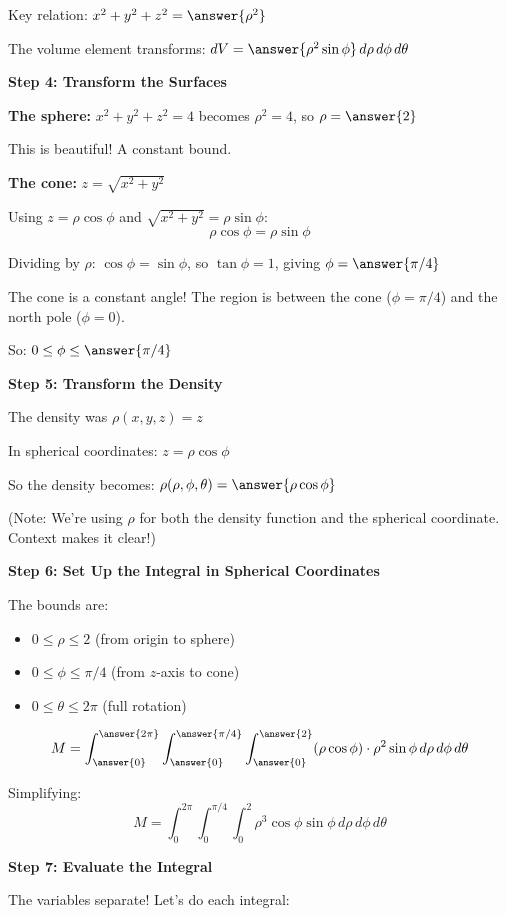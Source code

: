 \documentclass{ximera}
\begin{document}
\begin{problem}
Key relation: $x^2 + y^2 + z^2 = \answer{\rho^2}$

The volume element transforms: $dV = \answer{\rho^2 \sin\phi}\,d\rho\,d\phi\,d\theta$

\textbf{Step 4: Transform the Surfaces}

\textbf{The sphere:} $x^2 + y^2 + z^2 = 4$ becomes $\rho^2 = 4$, so $\rho = \answer{2}$

This is beautiful! A constant bound.

\textbf{The cone:} $z = \sqrt{x^2 + y^2}$

Using $z = \rho\cos\phi$ and $\sqrt{x^2+y^2} = \rho\sin\phi$:
$$\rho\cos\phi = \rho\sin\phi$$

Dividing by $\rho$: $\cos\phi = \sin\phi$, so $\tan\phi = 1$, giving $\phi = \answer{\pi/4}$

The cone is a constant angle! The region is between the cone ($\phi = \pi/4$) and the north pole ($\phi = 0$).

So: $0 \leq \phi \leq \answer{\pi/4}$

\textbf{Step 5: Transform the Density}

The density was $\rho(x,y,z) = z$

In spherical coordinates: $z = \rho\cos\phi$

So the density becomes: $\rho(\rho,\phi,\theta) = \answer{\rho\cos\phi}$

(Note: We're using $\rho$ for both the density function and the spherical coordinate. Context makes it clear!)

\textbf{Step 6: Set Up the Integral in Spherical Coordinates}

The bounds are:
\begin{itemize}
    \item $0 \leq \rho \leq 2$ (from origin to sphere)
    \item $0 \leq \phi \leq \pi/4$ (from $z$-axis to cone)
    \item $0 \leq \theta \leq 2\pi$ (full rotation)
\end{itemize}

$$M = \int_{\answer{0}}^{\answer{2\pi}} \int_{\answer{0}}^{\answer{\pi/4}} \int_{\answer{0}}^{\answer{2}} (\rho\cos\phi) \cdot \rho^2\sin\phi\,d\rho\,d\phi\,d\theta$$

Simplifying: 
$$M = \int_0^{2\pi} \int_0^{\pi/4} \int_0^2 \rho^3\cos\phi\sin\phi\,d\rho\,d\phi\,d\theta$$

\textbf{Step 7: Evaluate the Integral}

The variables separate! Let's do each integral:


\end{problem}
\end{document}
